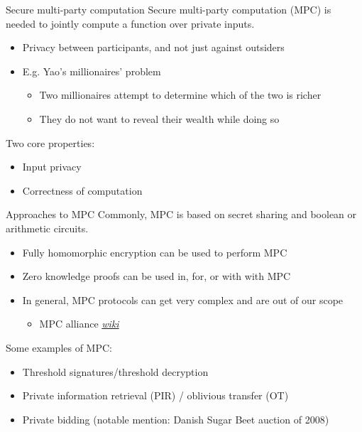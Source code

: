 \begin{frame}{Secure multi-party computation}
  Secure multi-party computation (MPC) is needed to jointly compute a function over private inputs.
  \begin{itemize}[<+(1)->]
    \item Privacy between participants, and not just against outsiders
    \item E.g. Yao's millionaires' problem
    \begin{itemize}
      \item Two millionaires attempt to determine which of the two is richer
      \item They do not want to reveal their wealth while doing so
    \end{itemize}
  \end{itemize}

  \pause
  Two core properties:
  \begin{itemize}[<+(1)->]
    \item Input privacy
    \item Correctness of computation
  \end{itemize}
\end{frame}

\begin{frame}{Approaches to MPC}
  Commonly, MPC is based on secret sharing and boolean or arithmetic circuits.
  \begin{itemize}[<+(1)->]
    \item Fully homomorphic encryption can be used to perform MPC
    \item Zero knowledge proofs can be used in, for, or with with MPC
    \item In general, MPC protocols can get very complex and are out of our scope
    \begin{itemize}
      \item MPC alliance \href{https://wiki.mpcalliance.org/protocols.html}{\textit{wiki}}
    \end{itemize}
  \end{itemize}

  \vspace*{1em}

  \pause
  Some examples of MPC:
  \begin{itemize}[<+(1)->]
    \item Threshold signatures/threshold decryption
    \item Private information retrieval (PIR) / oblivious transfer (OT)
    \item Private bidding (notable mention: Danish Sugar Beet auction of 2008)
  \end{itemize}
\end{frame}

